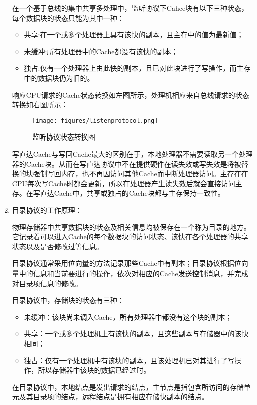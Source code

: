 \documentclass[a4paper]{ctexart}
\begin{document}
\begin{enumerate}
  在一个基于总线的集中共享多处理中，监听协议下Cahce块有以下三种状态，每个数据块的状态只能为其中一种：
  \begin{itemize}
    \item 共享:在一个或多个处理器上具有该快的副本，且主存中的值为最新值；
    \item 未缓冲:所有处理器中的Cache都没有该快的副本；
    \item 独占:仅有一个处理器上由此快的副本，且已对此块进行了写操作，而主存中的数据块仍为旧的。
  \end{itemize}
  响应CPU请求的Cache状态转换如左图所示，处理机相应来自总线请求的状态转换如右图所示：
  \begin{figure}[htbp]
    \caption{监听协议状态转换图}
    \centering
    \texttt{[image: figures/listenprotocol.png]}
  \end{figure}
  
  写直达Cache与写回Cache最大的区别在于，本地处理器不需要读取另一个处理器的Cache块。从而在写直达协议中不在提供硬件在读失效或写失效是将被替换的块强制写回内存，也不再因访问其他Cache而中断处理器访问。主存在在CPU每次写Cache时都会更新，所以在处理器产生读失效后就会直接访问主存。在写直达Cache中，共享或独占的Cache块都与主存保持一致性。
  
  \item 目录协议的工作原理：
  
  物理存储器中共享数据块的状态及相关信息均被保存在一个称为目录的地方。它记录着可以进入Cache的每个数据块的访问状态、该快在各个处理器的共享状态以及是否修改过等信息。
  
  目录协议通常采用位向量的方法记录那些Cache中有副本；目录协议根据位向量中的信息和当前要进行的操作，依次对相应的Cache发送控制消息，并完成对目录项信息的修改。
  
  目录协议中，存储块的状态有三种：
  \begin{itemize}
    \item 未缓冲：该块尚未调入Cache，所有处理器中都没有这个块的副本；
    \item 共享：一个或多个处理机上有该快的副本，且这些副本与存储器中的该快相同；
    \item 独占：仅有一个处理机中有该块的副本，且该处理机已对其进行了写操作，所以存储器中该块的数据已经过时。
  \end{itemize}
  在目录协议中，本地结点是发出请求的结点，主节点是指包含所访问的存储单元及其目录项的结点，远程结点是拥有相应存储快副本的结点。
  

\end{enumerate}
\end{document}
